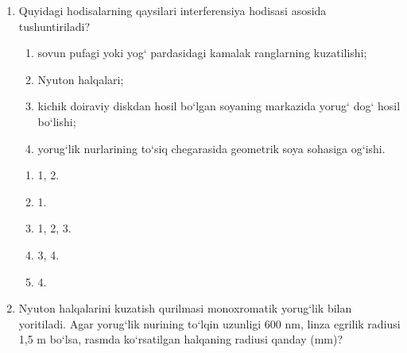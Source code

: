 \begin{enumerate}

\begin{enumerate}[label=\Alph*)]
\item 1-3, 2-4, 5-7, 6-8.
\item 1-3, 5-7.
\item 3-4, 2-6.
\item 1-4, 2-5.
\item 1-4-3, 2-5-6.
\end{enumerate}

\item Quyidagi hodisalarning qaysilari interferensiya hodisasi asosida tushuntiriladi?
\begin{enumerate}
\item sovun pufagi yoki yog‘ pardasidagi kamalak ranglarning kuzatilishi;
\item Nyuton halqalari;
\item kichik doiraviy diskdan hosil bo‘lgan soyaning markazida yorug‘ dog‘ hosil bo‘lishi;
\item yorug‘lik nurlarining to‘siq chegarasida geometrik soya sohasiga og‘ishi.
\end{enumerate}
\begin{enumerate}[label=\Alph*)]
\item 1, 2.
\item 1.
\item 1, 2, 3.
\item 3, 4.
\item 4.
\end{enumerate}

\item Nyuton halqalarini kuzatish qurilmasi monoxromatik yorug‘lik bilan yoritiladi. Agar yorug‘lik nurining to‘lqin uzunligi 600 nm, linza egrilik radiusi 1,5 m bo‘lsa, rasmda ko‘rsatilgan halqaning radiusi qanday (mm)?


\end{enumerate}
